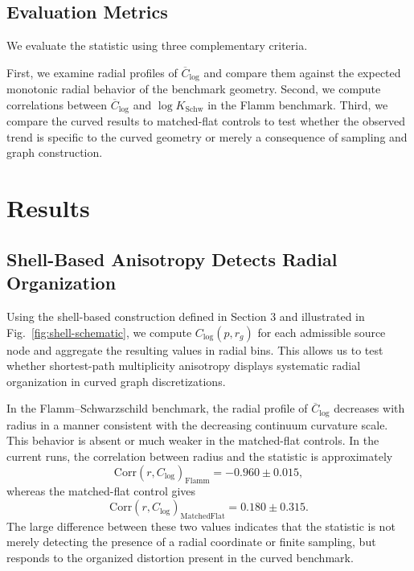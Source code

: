 \documentclass{svproc}
\begin{document}
\subsection{Evaluation Metrics}

We evaluate the statistic using three complementary criteria.

First, we examine radial profiles of $\overline{C}_{\log}$ and compare them against the expected monotonic radial behavior of the benchmark geometry. Second, we compute correlations between $\overline{C}_{\log}$ and $\log K_{\mathrm{Schw}}$ in the Flamm benchmark. Third, we compare the curved results to matched-flat controls to test whether the observed trend is specific to the curved geometry or merely a consequence of sampling and graph construction.

\section{Results}

\subsection{Shell-Based Anisotropy Detects Radial Organization}

Using the shell-based construction defined in Section 3 and illustrated in Fig.~\ref{fig:shell-schematic}, we compute $C_{\log}(p,r_g)$ for each admissible source node and aggregate the resulting values in radial bins. This allows us to test whether shortest-path multiplicity anisotropy displays systematic radial organization in curved graph discretizations.

In the Flamm--Schwarzschild benchmark, the radial profile of $\overline{C}_{\log}$ decreases with radius in a manner consistent with the decreasing continuum curvature scale. This behavior is absent or much weaker in the matched-flat controls. In the current runs, the correlation between radius and the statistic is approximately
\begin{equation}
\mathrm{Corr}(r,C_{\log})_{\mathrm{Flamm}}=-0.960\pm 0.015,
\end{equation}
whereas the matched-flat control gives
\begin{equation}
\mathrm{Corr}(r,C_{\log})_{\mathrm{MatchedFlat}}=0.180\pm 0.315.
\end{equation}
The large difference between these two values indicates that the statistic is not merely detecting the presence of a radial coordinate or finite sampling, but responds to the organized distortion present in the curved benchmark.
\end{document}
